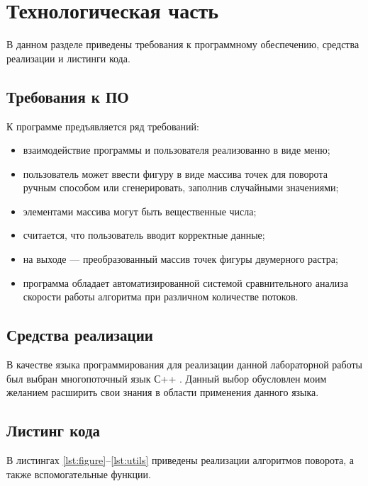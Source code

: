\chapter{Технологическая часть}

В данном разделе приведены требования к программному обеспечению, средства реализации и листинги кода.

\section{Требования к ПО}

К программе предъявляется ряд требований:
\begin{itemize}
	\item взаимодействие программы и пользователя реализованно в виде меню;
	\item пользователь может ввести фигуру в виде массива точек для поворота ручным способом или сгенерировать, заполнив случайными значениями;
	\item элементами массива могут быть вещественные числа;
	\item считается, что пользователь вводит корректные данные;
	\item на выходе — преобразованный массив точек фигуры двумерного растра;
	\item программа обладает автоматизированной системой сравнительного анализа скорости работы алгоритма при различном количестве потоков.
\end{itemize}

\section{Средства реализации}

В качестве языка программирования для реализации данной лабораторной работы был выбран многопоточный язык С++ \cite{cpp}. Данный выбор обусловлен моим желанием расширить свои знания в области применения данного языка.

\section{Листинг кода}

В листингах \ref{lst:figure}--\ref{lst:utils} приведены реализации алгоритмов поворота, а также вспомогательные функции.



\captionsetup{singlelinecheck = false, justification=raggedright}

